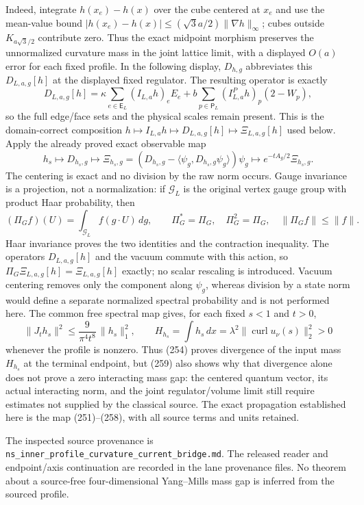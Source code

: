 Indeed, integrate $h(x_e)-h(x)$ over the cube centered at $x_e$ and use the mean-value bound $|h(x_e)-h(x)|\le(\sqrt3a/2)\|\nabla h\|_\infty$; cubes outside $K_{a\sqrt3/2}$ contribute zero.  Thus the exact midpoint morphism preserves the unnormalized curvature mass in the joint lattice limit, with a displayed $O(a)$ error for each fixed profile.  In the following display, $D_{h,g}$ abbreviates this $D_{L,a,g}[h]$ at the displayed fixed regulator.  The resulting operator is exactly
\[
 D_{L,a,g}[h]=\kappa\sum_{e\in\mathsf E_L}(I_{L,a}h)_eE_e
 +b\sum_{p\in\mathsf P_L}(I^P_{L,a}h)_p(2-W_p),
\]
so the full edge/face sets and the physical scales remain present.  This is the domain-correct composition $h\mapsto I_{L,a}h\mapsto D_{L,a,g}[h]\mapsto\Xi_{L,a,g}[h]$ used below.  Apply the already proved exact observable map
\[
 h_s\longmapsto D_{h_s,g}
 \longmapsto \Xi_{h_s,g}=
 (D_{h_s,g}-\langle\psi_g,D_{h_s,g}\psi_g\rangle)\psi_g
 \longmapsto e^{-tA_g/2}\Xi_{h_s,g}.
 \tag{258}
\]
The centering is exact and no division by the raw norm occurs.  Gauge invariance is a projection, not a normalization: if $\mathcal G_L$ is the original vertex gauge group with product Haar probability, then
\[
 (\Pi_G f)(U)=\int_{\mathcal G_L}f(g\mathbin{\cdot}U)\,dg,
 \qquad \Pi_G^*=\Pi_G,\quad \Pi_G^2=\Pi_G,\quad \|\Pi_Gf\|\le\|f\|.
\]
Haar invariance proves the two identities and the contraction inequality.  The operators $D_{L,a,g}[h]$ and the vacuum commute with this action, so $\Pi_G\Xi_{L,a,g}[h]=\Xi_{L,a,g}[h]$ exactly; no scalar rescaling is introduced.  Vacuum centering removes only the component along $\psi_g$, whereas division by a state norm would define a separate normalized spectral probability and is not performed here.  The common free spectral map gives, for each fixed $s<1$ and $t>0$,
\[
 \|J_th_s\|^2\le \frac{9}{\pi^4t^8}\,\|h_s\|_1^2,
 \qquad
 H_{h_s}=\int h_s\,dx=\lambda^2\|\operatorname{curl}u_\nu(s)\|_2^2>0
\tag{259}
\]
whenever the profile is nonzero.  Thus (254) proves divergence of the input mass $H_{h_s}$ at the terminal endpoint, but (259) also shows why that divergence alone does not prove a zero interacting mass gap: the centered quantum vector, its actual interacting norm, and the joint regulator/volume limit still require estimates not supplied by the classical source.  The exact propagation established here is the map (251)--(258), with all source terms and units retained.

The inspected source provenance is
\texttt{ns\_inner\_profile\_curvature\_current\_bridge.md}.
The released reader and endpoint/axis continuation are recorded in the lane
provenance files.  No theorem about a source-free four-dimensional Yang--Mills
mass gap is inferred from the sourced profile.



